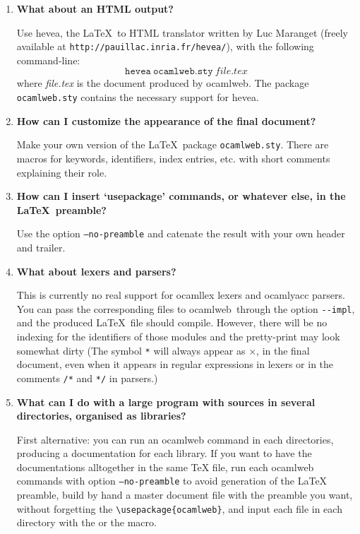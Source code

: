 \documentclass[12pt]{article}
\newcommand{\ocamlweb}{\textsf{ocamlweb}}
\begin{document}
\begin{enumerate}

\item \textbf{What about an HTML output?} ~\par

  Use \textsf{hevea}, the \LaTeX\ to HTML translator written by Luc
  Maranget (freely available at
  \texttt{http://pauillac.inria.fr/hevea/}), with the following
  command-line:
  \begin{displaymath}
    \texttt{hevea} ~ \texttt{ocamlweb.sty} ~ \textit{file.tex}
  \end{displaymath}
  where \textit{file.tex} is the document produced by \ocamlweb.
  The package \texttt{ocamlweb.sty} contains the necessary support for
  \textsf{hevea}.

\item \textbf{How can I customize the appearance of the final
    document?} ~\par 

  Make your own version of the \LaTeX\ package
  \texttt{ocamlweb.sty}. There are macros for keywords, identifiers,
  index entries, etc. with short comments explaining their role.

\item \textbf{How can I insert `usepackage' commands, or whatever else,
  in the \LaTeX\ preamble?} ~\par

  Use the option \texttt{--no-preamble} and catenate the result with your
  own header and trailer.

\item \textbf{What about lexers and parsers?} ~\par

  This is currently no real support for \textsf{ocamllex} lexers and
  \textsf{ocamlyacc} parsers. You can pass the corresponding files to
  \ocamlweb\ through the option \verb!--impl!, and the produced
  \LaTeX\ file should compile. However, there will be no indexing for
  the identifiers of those modules and the pretty-print may look
  somewhat dirty (The symbol \verb!*! will always appear as $\times$,
  in the final document, even when it appears in regular expressions
  in lexers or in the comments \verb!/*! and \verb!*/! in parsers.)

\item \textbf{What can I do with a large program with sources in several
    directories, organised as libraries?} ~

  First alternative: you can run an ocamlweb command in each
  directories, producing a documentation for each library. If you want
  to have the documentations alltogether in the same TeX file, run
  each ocamlweb commands with option \texttt{--no-preamble} to avoid
  generation of the LaTeX preamble, build by hand a master document
  file with the preamble you want, without forgetting the
  \verb|\usepackage{ocamlweb}|, and input each file in each directory
  with the \verb|| or the \verb|| macro.
  

\end{enumerate}
\end{document}
